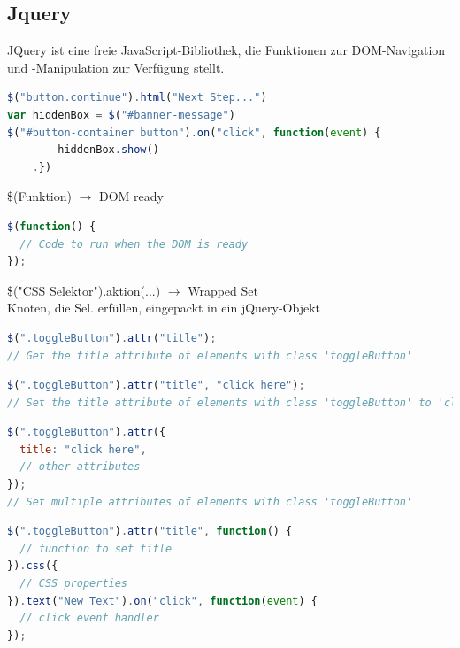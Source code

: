 \columnbreak

\subsection{Jquery}
JQuery ist eine freie JavaScript-Bibliothek, die Funktionen zur DOM-Navigation und -Manipulation zur Verfügung stellt.

\begin{lstlisting}[language=JavaScript, style=basesmol]
$("button.continue").html("Next Step...")
var hiddenBox = $("#banner-message")
$("#button-container button").on("click", function(event) {
        hiddenBox.show()
    .})
\end{lstlisting}

\begin{definition}{\$(Funktion)} $\rightarrow$ DOM ready\\
\begin{lstlisting}[language=JavaScript, style=basesmol]
$(function() { 
  // Code to run when the DOM is ready
});
\end{lstlisting}
\end{definition}

\begin{definition}{\$("CSS Selektor").aktion(...)} $\rightarrow$ Wrapped Set\\
  Knoten, die Sel. erfüllen, eingepackt in ein jQuery-Objekt
\begin{lstlisting}[language=JavaScript, style=basesmol]
$(".toggleButton").attr("title");
// Get the title attribute of elements with class 'toggleButton'
\end{lstlisting}
\begin{lstlisting}[language=JavaScript, style=basesmol]
$(".toggleButton").attr("title", "click here");
// Set the title attribute of elements with class 'toggleButton' to 'click here'
\end{lstlisting}
\begin{lstlisting}[language=JavaScript, style=basesmol]
$(".toggleButton").attr({
  title: "click here",
  // other attributes
});
// Set multiple attributes of elements with class 'toggleButton'
\end{lstlisting}
\begin{lstlisting}[language=JavaScript, style=basesmol]
$(".toggleButton").attr("title", function() {
  // function to set title
}).css({
  // CSS properties
}).text("New Text").on("click", function(event) {
  // click event handler
});
\end{lstlisting}
\end{definition}


